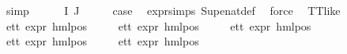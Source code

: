 \begin{isabellebody}
\ simp\isanewline
{}\isamarkupfalse%
\isanewline
\ \ \isamarkupfalse%
\ {\isacharparenleft}{\kern0pt}{}\ {\isasymPhi}\ I\ J{\isacharparenright}{\kern0pt}\isanewline
\ \ \isamarkupfalse%
\ \isamarkupfalse%
\ {\isacharquery}{\kern0pt}case\ \isamarkupfalse%
\ expr{\isachardot}{\kern0pt}simps\ Sup{\isacharunderscore}{\kern0pt}enat{\isacharunderscore}{\kern0pt}def\ \isamarkupfalse%
\ force{\isacharplus}{\kern0pt}\isanewline
{}\isamarkupfalse%
%
\endisatagproof
{\isafoldproof}%
%
\isadelimproof
\isanewline
%
\endisadelimproof
\isanewline
{}\isamarkupfalse%
\ \ {\isachardoublequoteopen}TT{\isacharunderscore}{\kern0pt}like\ {\isasymchi}{\isachardoublequoteclose}\isanewline
{}\ e{}{\isacharunderscore}{\kern0pt}tt{\isacharcolon}{\kern0pt}\ {\isachardoublequoteopen}expr{\isacharunderscore}{\kern0pt}{}\ {\isacharparenleft}{\kern0pt}hml{\isacharunderscore}{\kern0pt}pos\ {\isasymalpha}\ {\isasymchi}{\isacharparenright}{\kern0pt}\ {\isacharequal}{\kern0pt}\ {}{\isachardoublequoteclose}\isanewline
{}\ e{}{\isacharunderscore}{\kern0pt}tt{\isacharcolon}{\kern0pt}\ {\isachardoublequoteopen}expr{\isacharunderscore}{\kern0pt}{}\ {\isacharparenleft}{\kern0pt}hml{\isacharunderscore}{\kern0pt}pos\ {\isasymalpha}\ {\isasymchi}{\isacharparenright}{\kern0pt}\ {\isacharequal}{\kern0pt}\ {}{\isachardoublequoteclose}\isanewline
{}\ e{}{\isacharunderscore}{\kern0pt}tt{\isacharcolon}{\kern0pt}\ {\isachardoublequoteopen}expr{\isacharunderscore}{\kern0pt}{}\ {\isacharparenleft}{\kern0pt}hml{\isacharunderscore}{\kern0pt}pos\ {\isasymalpha}\ {\isasymchi}{\isacharparenright}{\kern0pt}\ {\isacharequal}{\kern0pt}\ {}{\isachardoublequoteclose}\isanewline
{}\ e{}{\isacharunderscore}{\kern0pt}tt{\isacharcolon}{\kern0pt}\ {\isachardoublequoteopen}expr{\isacharunderscore}{\kern0pt}{}\ {\isacharparenleft}{\kern0pt}hml{\isacharunderscore}{\kern0pt}pos\ {\isasymalpha}\ {\isasymchi}{\isacharparenright}{\kern0pt}\ {\isacharequal}{\kern0pt}\ {}{\isachardoublequoteclose}\isanewline
{}\ e{}{\isacharunderscore}{\kern0pt}tt{\isacharcolon}{\kern0pt}\ {\isachardoublequoteopen}expr{\isacharunderscore}{\kern0pt}{}\ {\isacharparenleft}{\kern0pt}hml{\isacharunderscore}{\kern0pt}pos\ {\isasymalpha}\ {\isasymchi}{\isacharparenright}{\kern0pt}\ {\isacharequal}{\kern0pt}\ {}{\isachardoublequoteclose}\isanewline

\end{isabellebody}
